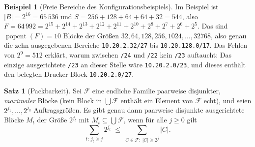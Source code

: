 \documentclass[a4paper,12pt, twoside]{report}
\theoremstyle{definition}
\newtheorem{beispiel}{Beispiel}
\newtheorem{satz}{Satz}
\DeclareMathOperator{\popcnt}{popcnt}
\begin{document}
\begin{beispiel}[Freie Bereiche des Konfigurationsbeispiels]
	Im Beispiel ist $|B| = 2^{16} = 65\,536$ und $S = 256 + 128 + 64 + 64 + 32 = 544$, also $F = 64\,992 = 2^{15}+2^{14}+2^{13}+2^{12}+2^{11}+2^{10}+2^{8}+2^{7}+2^{6}+2^{5}$. Das sind $\popcnt(F) = 10$ Blöcke der Größen $32,64,128,256,1024,\ldots,32768$, also genau die zehn ausgegebenen Bereiche \texttt{10.20.2.32/27} bis \texttt{10.20.128.0/17}. Das Fehlen von $2^9 = 512$ erklärt, warum zwischen \texttt{/24} und \texttt{/22} kein \texttt{/23} auftaucht: Das einzige ausgerichtete \texttt{/23} an dieser Stelle wäre \texttt{10.20.2.0/23}, und dieses enthält den belegten Drucker-Block \texttt{10.20.2.0/27}.
\end{beispiel}

\begin{satz}[Packbarkeit]
\label{satz:pack}
	Sei $\mathcal{F}$ eine endliche Familie paarweise disjunkter, \emph{maximaler} Blöcke (kein Block in $\bigcup\mathcal{F}$ enthält ein Element von $\mathcal{F}$ echt), und seien $2^{j_1},\ldots,2^{j_q}$ Auftragsgrößen. Es gibt genau dann paarweise disjunkte ausgerichtete Blöcke $M_t$ der Größe $2^{j_t}$ mit $M_t \subseteq \bigcup\mathcal{F}$, wenn für alle $j \ge 0$ gilt
	\[
	\sum_{t:\ j_t \ge j} 2^{j_t} \;\le\; \sum_{C\in\mathcal{F}:\ |C|\ge 2^j} |C|. \tag{$\ast$}
	\]
\end{satz}
\end{document}
